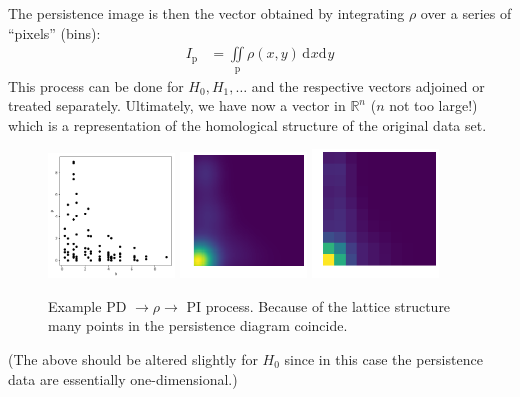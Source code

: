 \documentclass[11pt]{article}
\renewcommand{\d}[2][]{\mathrm{d}^{#1}{#2}}
\begin{document}
The persistence image is then the vector obtained by integrating $\rho$ over a series of ``pixels'' (bins):
\begin{align}
    I_\text{p} &= \iint\limits_\text{p}\rho(x,y)\,\d{x}\d{y}
\end{align}
This process can be done for $H_0,H_1,\ldots$ and the respective vectors adjoined or treated separately. Ultimately, we have now a vector in $\mathbb{R}^n$ ($n$ not too large!) which is a representation of the homological structure of the original data set.

\begin{figure}[h]
    \centering
    \includegraphics[width=0.3\textwidth]{pd_example}
    \includegraphics[width=0.3\textwidth]{rho_example}
    \includegraphics[width=0.3\textwidth]{pi_example}
    \caption{Example PD $\rightarrow\rho\rightarrow$ PI process. Because of the lattice structure many points in the persistence diagram coincide.}
\end{figure}

(The above should be altered slightly for $H_0$ since in this case the persistence data are essentially one-dimensional.)


\newpage
\end{document}
